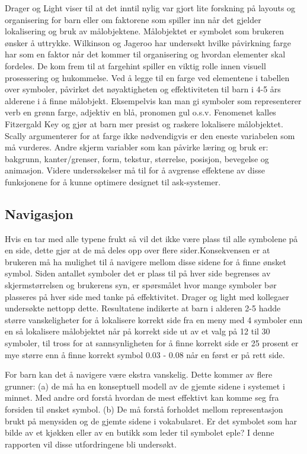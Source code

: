 Drager og Light \cite{aac} viser til at det inntil nylig var gjort lite forskning på layouts og organisering for barn eller om faktorene som spiller inn når det gjelder lokalisering og bruk av målobjektene. Målobjektet er symbolet som brukeren ønsker å uttrykke. Wilkinson og Jageroo \cite{Wilkinson2006} har undersøkt hvilke påvirkning farge har som en faktor når det kommer til organisering og hvordan elementer skal fordeles. De kom frem til at fargehint spiller en viktig rolle innen visuell prosessering  og hukommelse. Ved å legge til en farge ved elementene i tabellen over symboler, påvirket det nøyaktigheten og effektiviteten til barn i 4-5 års alderene i å finne målobjekt. Eksempelvis kan man gi symboler som representerer verb en grønn farge, adjektiv en blå, pronomen gul o.s.v. Fenomenet kalles Fitzergald Key og gjør at barn mer presist og raskere lokalisere målobjektet. Scally \cite{Scally} argumenterer for at farge ikke nødvendigvis er den eneste variabelen som må vurderes. Andre skjerm variabler som kan påvirke læring og bruk er: bakgrunn, kanter/grenser, form, tekstur, størrelse, posisjon, bevegelse og animasjon. Videre undersøkelser må til for å avgrense effektene av disse funksjonene for å kunne optimere designet til ask-systemer.


\subsection{Navigasjon}
\label{subsec:navigasjon}

Hvis en tar med alle typene frukt så vil det ikke være plass til alle symbolene på en side, dette gjør at de må deles opp over flere sider.Konsekvensen er at brukeren må ha mulighet til å navigere mellom disse sidene for å finne ønsket symbol. Siden antallet symboler det er plass til på hver side begrenses av skjermstørrelsen og brukerens syn, er spørsmålet hvor mange symboler bør plasseres på hver side med tanke på effektivitet. Drager og light med kollegaer undersøkte nettopp dette. Resultatene indikerte at barn i alderen 2-5 hadde større vanskeligheter for å lokalisere korrekt side fra en meny med 4 symboler enn en så lokalisere målobjektet når på korrekt side ut av et valg på 12 til 30 symboler, til tross for at sannsynligheten for å finne korrekt side er 25 prosent er mye større enn å finne korrekt symbol 0.03 - 0.08 når en først er på rett side.

For barn kan det å navigere være ekstra vanskelig. Dette kommer av flere grunner: (a) de må ha en konseptuell modell av de gjemte sidene i systemet i minnet. Med andre ord forstå hvordan de mest effektivt kan komme seg fra forsiden til ønsket symbol. (b) De må forstå forholdet mellom representasjon brukt på menysiden og de gjemte sidene i vokabularet. Er det symbolet som har bilde av et kjøkken eller av en butikk som leder til symbolet eple? I denne rapporten vil disse utfordringene bli undersøkt.


